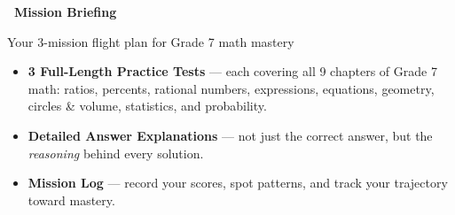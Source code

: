 
\thispagestyle{empty}

{
\sffamily

\begin{center}
    \textcolor{funBlueDark}{\fontsize{26}{30}\selectfont\bfseries
    \faRocket~Mission Briefing~\faRocket}

    \smallskip
    \textcolor{funGray}{\normalsize Your 3-mission flight plan for Grade 7 math mastery}
\end{center}

\vspace{4mm}

\begin{tcolorbox}[
    enhanced,
    colback=funBlueDark!6,
    colframe=funBlueDark!50,
    arc=10pt, boxrule=1.2pt,
    left=5mm, right=5mm, top=3mm, bottom=3mm,
    title={\faClipboardList~Mission Payload},
    colbacktitle=funBlueDark!15,
    coltitle=black,
    fonttitle=\bfseries\sffamily,
]
    \small
    \begin{itemize}[leftmargin=*, itemsep=3pt]
        \item \textbf{3 Full-Length Practice Tests} --- each covering all 9 chapters
            of Grade 7 math: ratios, percents, rational numbers, expressions,
            equations, geometry, circles \& volume, statistics, and probability.
        \item \textbf{Detailed Answer Explanations} --- not just the correct answer,
            but the \textit{reasoning} behind every solution.
        \item \textbf{Mission Log} --- record your scores, spot patterns,
            and track your trajectory toward mastery.
    \end{itemize}
\end{tcolorbox}

\vspace{2mm}

}
